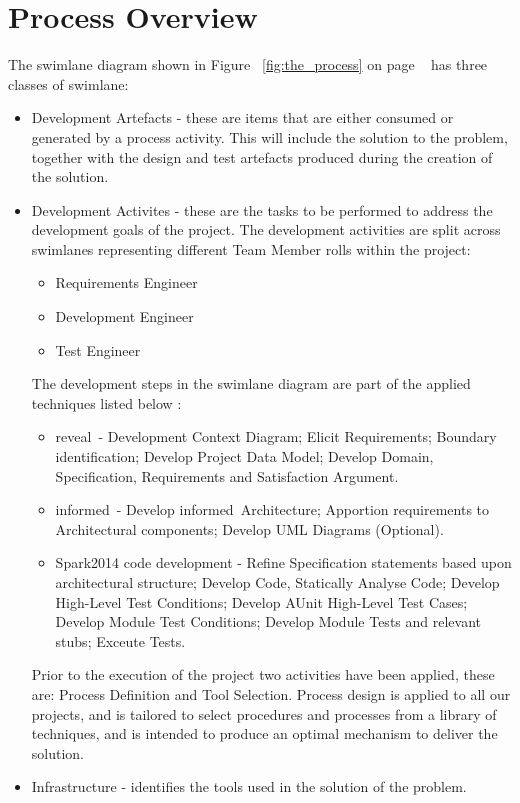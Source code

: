 \documentclass{report}
\newcommand{\spark}[0]{{\sc Spark}}
\newcommand{\reveal}[0]{{\sc reveal}\texttrademark}
\newcommand{\informed}[0]{{\sc informed}}
\begin{document}
\section{Process Overview}
The swimlane diagram shown in Figure ~\ref{fig:the_process} on page
~\pageref{fig:the_process} has three classes of swimlane:

\begin{itemize}
\item Development Artefacts - these are items that are either consumed
  or generated by a process activity. This will include the solution
  to the problem, together with the design and test artefacts produced
  during the creation of the solution.

\item Development Activites - these are the tasks to be performed to
  address the development goals of the project. The development
  activities are split across swimlanes representing different Team
  Member rolls within the project:

  \begin{itemize}
  \item Requirements Engineer
  \item Development Engineer
  \item Test Engineer
  \end{itemize}

  The development steps in the swimlane diagram are part of the
  applied techniques listed below :

  \begin{itemize}
  \item \reveal\ - Development Context Diagram; Elicit Requirements;
    Boundary identification; Develop Project Data Model; Develop
    Domain, Specification, Requirements and Satisfaction Argument.

  \item \informed\ - Develop \informed\ Architecture; Apportion
    requirements to Architectural components; Develop UML Diagrams
    (Optional).

  \item \spark 2014 code development - Refine Specification statements
    based upon architectural structure; Develop Code, Statically
    Analyse Code; Develop High-Level Test Conditions; Develop AUnit
    High-Level Test Cases; Develop Module Test Conditions; Develop
    Module Tests and relevant stubs; Exceute Tests.
  \end{itemize}

  Prior to the execution of the project two activities have been
  applied, these are: Process Definition and Tool Selection.  Process
  design is applied to all our projects, and is tailored to select
  procedures and processes from a library of techniques, and is
  intended to produce an optimal mechanism to deliver the solution.

\item Infrastructure - identifies the tools used in the solution of
  the problem.
\end{itemize}
\end{document}
